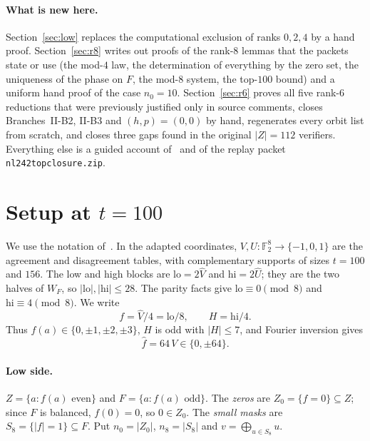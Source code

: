 \documentclass[11pt]{article}
\theoremstyle{definition}
\theoremstyle{remark}
\newcommand{\F}{\mathbb{F}}
\newcommand{\lo}{\mathrm{lo}}
\newcommand{\hi}{\mathrm{hi}}
\newcommand{\code}[1]{\texttt{#1}}
\DeclareRobustCommand{\_}{\textunderscore\allowbreak}
\newcommand{\main}{\cite{Main}}
\begin{document}
\paragraph{What is new here.} Section~\ref{sec:low} replaces the computational exclusion of ranks $0,2,4$ by a hand proof. Section~\ref{sec:r8} writes out proofs of the rank-$8$ lemmas that the packets state or use (the mod-$4$ law, the determination of everything by the zero set, the uniqueness of the phase on $F$, the mod-$8$ system, the top-$100$ bound) and a uniform hand proof of the case $n_0=10$. Section~\ref{sec:r6} proves all five rank-$6$ reductions that were previously justified only in source comments, closes Branches~II-B2, II-B3 and $(h,p)=(0,0)$ by hand, regenerates every orbit list from scratch, and closes three gaps found in the original $|Z|=112$ verifiers. Everything else is a guided account of~\main{} and of the replay packet \code{nl242\_top\_closure.zip}.

\section{Setup at $t=100$}\label{sec:setup}

We use the notation of~\main{}. In the adapted coordinates, $V,U:\F_2^8\to\{-1,0,1\}$ are the agreement and disagreement tables, with complementary supports of sizes $t=100$ and $156$. The low and high blocks are $\lo=2\widehat V$ and $\hi=2\widehat U$; they are the two halves of $W_F$, so $|\lo|,|\hi|\le28$. The parity facts give $\lo\equiv0\pmod 8$ and $\hi\equiv4\pmod 8$. We write
\[
  f=\widehat V/4=\lo/8,\qquad H=\hi/4 .
\]
Thus $f(a)\in\{0,\pm1,\pm2,\pm3\}$, $H$ is odd with $|H|\le7$, and Fourier inversion gives
\begin{equation}\label{eq:fhat}
  \widehat f = 64\,V\in\{0,\pm64\}.
\end{equation}

\paragraph{Low side.} $Z=\{a:f(a)\text{ even}\}$ and $F=\{a:f(a)\text{ odd}\}$. The \emph{zeros} are $Z_0=\{f=0\}\subseteq Z$; since $F$ is balanced, $f(0)=0$, so $0\in Z_0$. The \emph{small masks} are $S_8=\{|f|=1\}\subseteq F$. Put $n_0=|Z_0|$, $n_8=|S_8|$ and $v=\bigoplus_{u\in S_8}u$.
\end{document}

